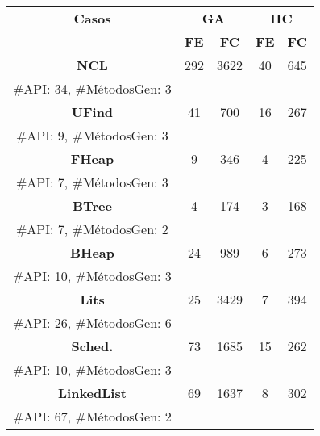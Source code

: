 \setlength{\tabcolsep}{4pt} 

\begin{table}[H]
\centering
\begin{tabular}{cccccc}
\hline
\multicolumn{2}{c}{\textbf{Casos}} & \multicolumn{2}{c}{\textbf{GA}} & \multicolumn{2}{c}{\textbf{HC}} \\
\cline{3-6}
\multicolumn{2}{c}{} & \textbf{\tiny FE} & \textbf{\tiny FC} & \textbf{\tiny FE} & \textbf{\tiny FC} \\
\hline
\multicolumn{2}{c}{\textbf{NCL}}            & 292   & 3622 & 40   & 645  \\
\multicolumn{2}{c}{\tiny \#API: 34, \#MétodosGen: 3} & & & & \\

\multicolumn{2}{c}{\textbf{UFind}}          & 41     & 700    & 16  & 267  \\
\multicolumn{2}{c}{\tiny \#API: 9, \#MétodosGen: 3}  & & & & \\

\multicolumn{2}{c}{\textbf{FHeap}}          & 9      & 346   & 4     & 225  \\
\multicolumn{2}{c}{\tiny \#API: 7, \#MétodosGen: 3}  & & & & \\

\multicolumn{2}{c}{\textbf{BTree}}          & 4       & 174   & 3    & 168  \\
\multicolumn{2}{c}{\tiny \#API: 7, \#MétodosGen: 2}  & & & & \\

\multicolumn{2}{c}{\textbf{BHeap}}          & 24    & 989  & 6    & 273  \\
\multicolumn{2}{c}{\tiny \#API: 10, \#MétodosGen: 3} & & & & \\

\multicolumn{2}{c}{\textbf{Lits}}           & 25   & 3429 & 7    & 394  \\
\multicolumn{2}{c}{\tiny \#API: 26, \#MétodosGen: 6} & & & & \\

\multicolumn{2}{c}{\textbf{Sched.}}         & 73     & 1685 & 15   & 262  \\
\multicolumn{2}{c}{\tiny \#API: 10, \#MétodosGen: 3} & & & & \\

\multicolumn{2}{c}{\textbf{LinkedList}}     & 69     & 1637 & 8    & 302 \\
\multicolumn{2}{c}{\tiny \#API: 67, \#MétodosGen: 2} & & & & \\


\end{tabular}
\end{table}
